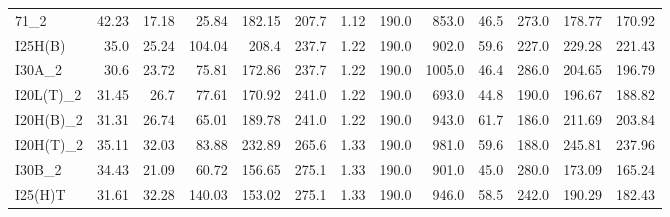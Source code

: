 \documentclass{article}
\begin{document}
\begin{table}[htb]
\begin{tabular}{lrrrrrrrrrrrr}
    71\_2              &  42.23 &  17.18 &  25.84 & 182.15 &           207.7 &         1.12 &                      190.0 &           853.0 &         46.5 &                      273.0 & 178.77 & 170.92 \\
    I25H(B)           &   35.0 &  25.24 & 104.04 &  208.4 &           237.7 &         1.22 &                      190.0 &           902.0 &         59.6 &                      227.0 & 229.28 & 221.43 \\
    I30A\_2            &   30.6 &  23.72 &  75.81 & 172.86 &           237.7 &         1.22 &                      190.0 &          1005.0 &         46.4 &                      286.0 & 204.65 & 196.79 \\
    I20L(T)\_2        &  31.45 &   26.7 &  77.61 & 170.92 &           241.0 &         1.22 &                      190.0 &           693.0 &         44.8 &                      190.0 & 196.67 & 188.82 \\
    I20H(B)\_2         &  31.31 &  26.74 &  65.01 & 189.78 &           241.0 &         1.22 &                      190.0 &           943.0 &         61.7 &                      186.0 & 211.69 & 203.84 \\
    I20H(T)\_2         &  35.11 &  32.03 &  83.88 & 232.89 &           265.6 &         1.33 &                      190.0 &           981.0 &         59.6 &                      188.0 & 245.81 & 237.96 \\
    I30B\_2            &  34.43 &  21.09 &  60.72 & 156.65 &           275.1 &         1.33 &                      190.0 &           901.0 &         45.0 &                      280.0 & 173.09 & 165.24 \\
    I25(H)T          &  31.61 &  32.28 & 140.03 & 153.02 &           275.1 &         1.33 &                      190.0 &           946.0 &         58.5 &                      242.0 & 190.29 & 182.43 \\
    \bottomrule
    \end{tabular}
    \end{table}
        
\end{document}
